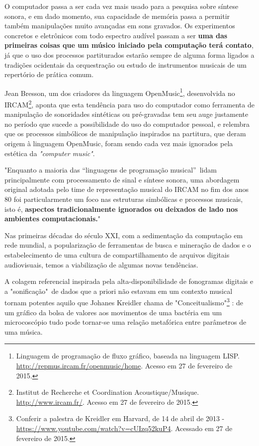 \documentclass[
	12pt,				%
	openright,			%
	twoside,			%
	a4paper,			%
	english,			%
	french,				%
	spanish,			%
	brazil				%
	]{abntex2}
\begin{document}
O computador passa a ser cada vez mais usado para a pesquisa sobre síntese sonora, e em dado momento,  sua capacidade de memória passa a permitir também manipulações muito avançadas em sons gravados. Os experimentos concretos e eletrônicos com todo espectro audível passam a ser \textbf{uma das primeiras coisas que um músico iniciado pela computação terá contato}, já que o uso dos processos partiturados estarão sempre de alguma forma ligados a tradições ocidentais da orquestração ou estudo de instrumentos musicais de um repertório de prática comum.

Jean Bresson, um dos criadores da linguagem OpenMusic\footnote{Linguagem de programação de fluxo gráfico, baseada na linguagem LISP. \url{http://repmus.ircam.fr/openmusic/home}. Acesso em 27 de fevereiro de 2015.}, desenvolvida no IRCAM\footnote{Institut de Recherche et Coordination Acoustique/Musique. \url{http://www.ircam.fr/}. Acesso em 27 de fevereiro de 2015.}, aponta que esta tendência para uso do computador como ferramenta de manipulação de sonoridades sintéticas ou pré-gravadas tem seu auge justamente no período que sucede a possibilidade do uso do computador pessoal, e relembra que os processos simbólicos de manipulação inspirados na partitura, que deram origem à linguagem OpenMusic, foram sendo cada vez mais ignorados pela estética da \textit{"computer music"}.


\begin{citacao}
"Enquanto a maioria das “linguagens de programação musical”\ lidam principalmente com processamento de sinal e síntese sonora, uma abordagem original adotada pelo time de representação musical do IRCAM no fim dos anos 80 foi particularmente um foco nas estruturas simbólicas e processos musicais, isto é, \textbf{aspectos tradicionalmente ignorados ou deixados de lado nos ambientes computacionais.}"\ \cite[ grifo nosso]{bresson2011openmusic}
\end{citacao}

Nas primeiras décadas do século XXI, com a sedimentação da computação em rede mundial, a popularização de ferramentas de busca e mineração de dados e o estabelecimento de uma cultura de compartilhamento de arquivos digitais audiovisuais, temos a viabilização de algumas novas tendências.

A colagem referencial inspirada pela alta-disponibilidade de fonogramas digitais e a "sonificação"\ de dados que a priori não estavam em um contexto musical tornam potentes aquilo que Johanes Kreidler chama de "Conceitualismo"\footnote{Conferir a palestra de Kreidler em Harvard, de 14 de abril de 2013 - \url{https://www.youtube.com/watch?v=cUIzq52kuP4}. Acessado em 27 de fevereiro de 2015.} : de um gráfico da bolsa de valores aos movimentos de uma bactéria em um microcoscópio tudo pode tornar-se uma relação metafórica entre parâmetros de uma música.
\end{document}
